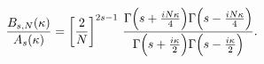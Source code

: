 \begin{equation}
\frac{B_{s,N}(\kappa)}{A_s(\kappa)}=\left[\frac{2}{N}\right]^{2s-1}\,
\frac{\Gamma\Bigl(s+\frac{iN\kappa}{4}\Bigr)\Gamma\Bigl(s-\frac{iN\kappa}{4}\Bigr)}
{\Gamma\Bigl(s+\frac{i\kappa}{2}\Bigr)\Gamma\Bigl(s-\frac{i\kappa}{2}\Bigr)}.
\label{B/A}
\end{equation}

